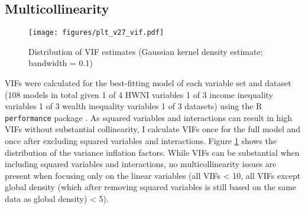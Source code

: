 \documentclass[11pt]{article}
\begin{document}
\subsection{Multicollinearity}
\label{app_vif}
\begin{figure}[htbp]
\centering
\texttt{[image: figures/plt\_v27\_vif.pdf]}
\caption{\label{fig:vif}Distribution of VIF estimates (Gaussian kernel density estimate; bandwidth = 0.1)}
\end{figure}


VIFs were calculated for the best-fitting model of each variable set and dataset (108 models in total given 1 of 4 HWNI variables \texttimes{} 1 of 3 income inequality variables \texttimes{} 1 of 3 wealth inequality variables \texttimes{} 1 of 3 datasets) using the R \texttt{performance} package \parencite{Luedecke_etal_2021_performance}. 
As squared variables and interactions can result in high VIFs without substantial collinearity, I calculate VIFs once for the full model and once after excluding squared variables and interactions.
Figure \ref{fig:vif} shows the distribution of the variance inflation factors.
While VIFs can be substantial when including squared variables and interactions, no multicollinearity issues are present when focusing only on the linear variables (all VIFs < 10, all VIFs except global density (which after removing squared variables is still based on the same data as global density) < 5).
\end{document}
